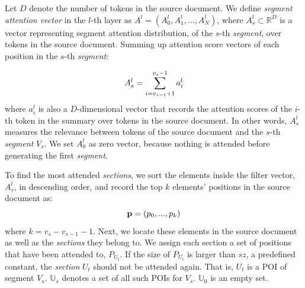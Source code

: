 Let $D$ denote the number of tokens in the source document.
We define \textit{segment attention vector} in the $l$-th layer as 
$A^{l} = (A_{0}^{l}, A_{1}^{l},..., A_{N}^{l})$, 
where $A_s^l\subset \mathbb{R}^{D}$ is a vector representing 
segment attention distribution, of the $s$-th \textit{segment},
over tokens in the source document. Summing up attention score vectors 
of each position in the $s$-th \textit{segment}:

\begin{equation}
\small
    A_{s}^{l} = \sum_{i=v_{s-1}+1}^{v_{s}-1}a_{i}^{l}
\end{equation}
where $a_i^l$ is also a $D$-dimensional vector that records 
the attention scores of the $i$-th token in the summary over 
tokens in the source document. In other words, $ A_{s}^{l}$ 
measures the relevance between tokens of the source document and 
the $s$-th \textit{segment} $V_s$. 
We set $A_{0}^{l}$ as zero vector, because nothing is attended before generating 
the first \textit{segment}. 


To find the most attended \textit{sections}, 
we sort the elements inside the filter vector, 
$A_{s}^{l}$, in descending order, 
and record the top $k$ elements' positions in 
the source document as: 
\begin{equation}
\small
    \mathbf{p}=(p_{0},...,p_{k})
\end{equation}
where $k=v_{s}-v_{s-1}-1$.
Next, we locate these elements in the source document as well as
the \textit{sections} they belong to. 
We assign each section a set of positions that have been attended to, 
$P_{U_{t}}$. 
If the size of $P_{U_{t}}$ is larger than
$sz$, a predefined constant,
the \textit{section} $U_{t}$ should not be attended again. 
That is, $U_{t}$ is a POI of segment $V_{s}$.
$\mathbb{U}_{s}$ denotes a set of all such POIs for $V_s$.
$\mathbb{U}_{0}$ is an empty set.

